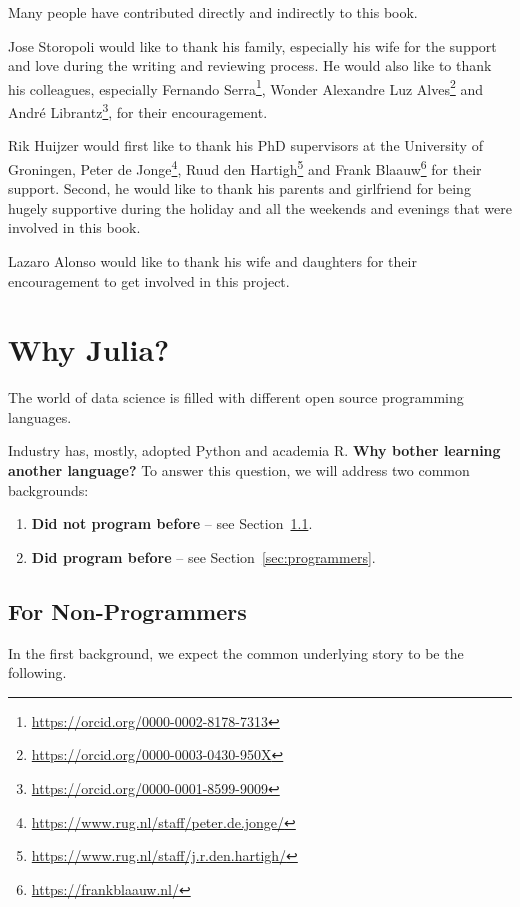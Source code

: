 \documentclass[
  notoc %
]{tufte-book}
\DeclareRobustCommand{\href}[2]{#2\footnote{\url{#1}}}
\begin{document}
Many people have contributed directly and indirectly to this book.

Jose Storopoli would like to thank his family, especially his wife for
the support and love during the writing and reviewing process. He would
also like to thank his colleagues, especially
\href{https://orcid.org/0000-0002-8178-7313}{Fernando Serra},
\href{https://orcid.org/0000-0003-0430-950X}{Wonder Alexandre Luz Alves}
and \href{https://orcid.org/0000-0001-8599-9009}{André Librantz}, for
their encouragement.

Rik Huijzer would first like to thank his PhD supervisors at the
University of Groningen,
\href{https://www.rug.nl/staff/peter.de.jonge/}{Peter de Jonge},
\href{https://www.rug.nl/staff/j.r.den.hartigh/}{Ruud den Hartigh} and
\href{https://frankblaauw.nl/}{Frank Blaauw} for their support. Second,
he would like to thank his parents and girlfriend for being hugely
supportive during the holiday and all the weekends and evenings that
were involved in this book.

Lazaro Alonso would like to thank his wife and daughters for their
encouragement to get involved in this project.

\hypertarget{sec:why_julia}{%
\chapter{Why Julia?}\label{sec:why_julia}}

The world of data science is filled with different open source
programming languages.

Industry has, mostly, adopted Python and academia R. \textbf{Why bother
learning another language?} To answer this question, we will address two
common backgrounds:

\begin{enumerate}
\def\labelenumi{\arabic{enumi}.}
\item
  \textbf{Did not program before} -- see
  Section~\ref{sec:non-programmers}.
\item
  \textbf{Did program before} -- see Section~\ref{sec:programmers}.
\end{enumerate}

\hypertarget{sec:non-programmers}{%
\section{For Non-Programmers}\label{sec:non-programmers}}

In the first background, we expect the common underlying story to be the
following.
\end{document}
